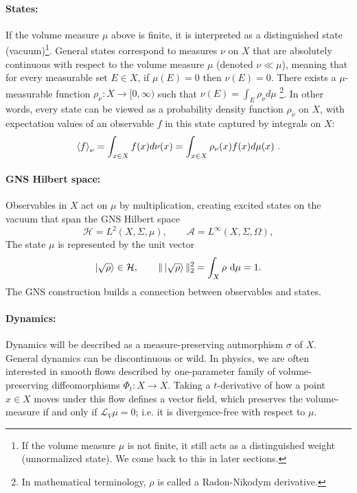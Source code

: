 \documentclass[a4paper,11pt]{article}
\theoremstyle{definition}
\newcommand{\dd}{\,\mathrm{d}}
\newcommand{\cH}{\mathcal{H}}
\newcommand{\mA}{\mathcal{A}}
\begin{document}
\paragraph{States:} If the volume measure $\mu$ above is finite, it is interpreted as a distinguished state (vacuum)\footnote{If the volume measure $\mu$ is not finite, it still acts as a distinguished weight (unnormalized state). We come back to this in later sections.}. General states correspond to measures $\nu$ on $X$ that are absolutely continuous with respect to the volume measure $\mu$ (denoted $\nu\ll \mu$), meaning that for every measurable set $E\in X$, if $\mu(E)=0$ then $\nu(E)=0$.
There exists a $\mu$-measurable function $\rho_\nu:X\to [0,\infty)$ such that $\nu(E)=\int_E \rho_\nu d\mu$ \footnote{In mathematical terminology, $\rho$ is called a Radon-Nikodym derivative.}. In other words, every state can be viewed as a probability density function $\rho_\nu$ on $X$, with expectation values of an observable $f$ in this state captured by integrals on $X$: 
\begin{align}
\braket{f}_\nu=\int_{x\in X}f(x) d\nu(x)=\int_{x\in X} \rho_\nu(x) f(x) d\mu(x)\ .
\end{align}

\paragraph{GNS Hilbert space:} Observables in $X$ act on $\mu$ by multiplication, creating excited states on the vacuum that span the GNS Hilbert space 
\[
  \cH=L^2(X,\Sigma,\mu),
  \qquad
  \mA=L^\infty(X,\Sigma,\Omega),
\]
The state $\mu$ is represented by the unit vector
\[
  \ket{\sqrt{\rho}}\in\cH,
  \qquad
  \|\ket{\sqrt{\rho}}\|_2^2=\int_X\rho\,\dd\mu=1.
\]
The GNS construction builds a connection between observables and states.


\paragraph{Dynamics:} Dynamics will be described as a measure-preserving autmorphism $\sigma$ of $X$. General dynamics can be discontinuous or wild. In physics, we are often interested in smooth flows described by one-parameter family of volume-preserving diffeomorphisms $\Phi_t:X\to X$. Taking a $t$-derivative of how a point $x\in X$ moves under this flow defines a vector field, which preserves the volume-measure if and only if $\mathcal{L}_V\mu=0$; i.e. it is divergence-free with respect to $\mu$. 
\end{document}
